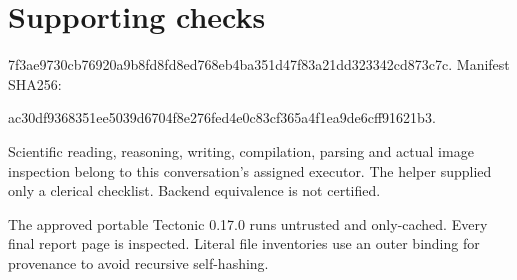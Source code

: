 \documentclass[10pt]{article}
\begin{document}
\section*{Supporting checks}
7f3ae9730cb76920a9b8fd8fd8ed768eb4ba351d47f83a21dd323342cd873c7c. Manifest SHA256:\par
ac30df9368351ee5039d6704f8e276fed4e0c83cf365a4f1ea9de6cff91621b3.\par
Scientific reading, reasoning, writing, compilation, parsing and actual image inspection belong to this conversation’s assigned executor. The helper supplied only a clerical checklist. Backend equivalence is not certified.\par
The approved portable Tectonic 0.17.0 runs untrusted and only-cached. Every final report page is inspected. Literal file inventories use an outer binding for provenance to avoid recursive self-hashing.\par
\end{document}
